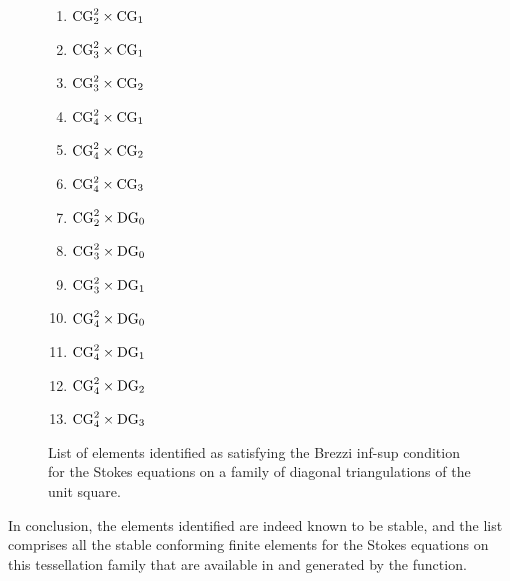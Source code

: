 \begin{figure}
  \begin{center}
    \begin{minipage}[t]{0.3\linewidth}
      \begin{enumerate}
      \item $\mathrm{CG}_2^2 \times \mathrm{CG}_1$
      \item $\mathrm{CG}_3^2 \times \mathrm{CG}_1$
      \item $\mathrm{CG}_3^2 \times \mathrm{CG}_2$
      \item $\mathrm{CG}_4^2 \times \mathrm{CG}_1$
      \item $\mathrm{CG}_4^2 \times \mathrm{CG}_2$
      \end{enumerate}
    \end{minipage}
    \begin{minipage}[t]{0.3\linewidth}
      \begin{enumerate}
        \setcounter{enumi}{5}
      \item $\mathrm{CG}_4^2 \times \mathrm{CG}_3$
      \item $\mathrm{CG}_2^2 \times \mathrm{DG}_0$
      \item $\mathrm{CG}_3^2 \times \mathrm{DG}_0$
      \item $\mathrm{CG}_3^2 \times \mathrm{DG}_1$
      \end{enumerate}
      \end{minipage}
    \begin{minipage}[t]{0.3\linewidth}
      \begin{enumerate}
        \setcounter{enumi}{9}
      \item $\mathrm{CG}_4^2 \times \mathrm{DG}_0$
      \item $\mathrm{CG}_4^2 \times \mathrm{DG}_1$
      \item $\mathrm{CG}_4^2 \times \mathrm{DG}_2$
      \item $\mathrm{CG}_4^2 \times \mathrm{DG}_3$
      \end{enumerate}
    \end{minipage}
  \end{center}
  \caption{List of elements identified as satisfying the Brezzi
    inf-sup condition for the Stokes equations on a family of diagonal
    triangulations of the unit square.}
  \label{rognes:fig:stokeslist}
\end{figure}

In conclusion, the elements identified are indeed known to be stable,
and the list comprises all the stable conforming finite elements for
the Stokes equations on this tessellation family that are available in
\ffc{} and generated by the  function.

